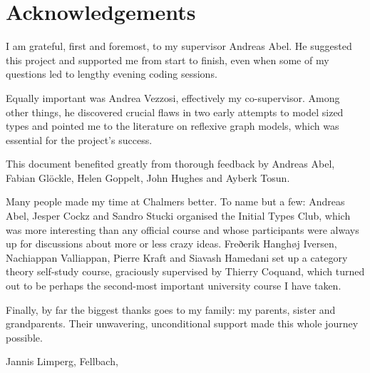 \thispagestyle{plain}			%
\section*{Acknowledgements}

I am grateful, first and foremost, to my supervisor Andreas Abel. He suggested
this project and supported me from start to finish, even when some of my
questions led to lengthy evening coding sessions.

Equally important was Andrea Vezzosi, effectively my co-supervisor. Among other
things, he discovered crucial flaws in two early attempts to model sized types
and pointed me to the literature on reflexive graph models, which was essential
for the project's success.

This document benefited greatly from thorough feedback by Andreas Abel, Fabian
Glöckle, Helen Goppelt, John Hughes and Ayberk Tosun.

Many people made my time at Chalmers better. To name but a few: Andreas Abel,
Jesper Cockz and Sandro Stucki organised the Initial Types Club, which was more
interesting than any official course and whose participants were always up for
discussions about more or less crazy ideas. Freðerik Hanghøj Iversen, Nachiappan
Valliappan, Pierre Kraft and Siavash Hamedani set up a category theory
self-study course, graciously supervised by Thierry Coquand, which turned out to
be perhaps the second-most important university course I have taken.

Finally, by far the biggest thanks goes to my family: my parents, sister and
grandparents. Their unwavering, unconditional support made this whole journey
possible.


\vspace{1.5cm}
\hfill
Jannis Limperg, Fellbach, \monthname \space \the\year

\newpage				%
\thispagestyle{empty}
\mbox{}
